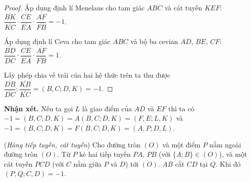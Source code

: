 \documentclass{article} %
\begin{document}
        \begin{proof}
            Áp dụng định lí Menelaus cho tam giác \(ABC\) và cát tuyến \(KEF\): \(\dfrac{\overline{BK}}{\overline{KC}} \cdot \dfrac{\overline{CE}}{\overline{EA}} \cdot \dfrac{\overline{AF}}{\overline{FB}} = -1\).

            Áp dụng định lí Ceva cho tam giác \(ABC\) và bộ ba cevian \(AD\), \(BE\), \(CF\): \(\dfrac{\overline{BD}}{\overline{DC}} \cdot \dfrac{\overline{CE}}{\overline{EA}} \cdot \dfrac{\overline{AF}}{\overline{FB}} = 1\).

            Lấy phép chia vế trái của hai hệ thức trên ta thu được \(\dfrac{\overline{DB}}{\overline{DC}} : \dfrac{\overline{KB}}{\overline{KC}} = (B,C;D,K) = -1\).
        \end{proof}

        \textbf{Nhận xét.} Nếu ta gọi \(L\) là giao điểm của \(AD\) và \(EF\) thì ta có \(-1 = (B,C;D,K) = A(B,C;D,K) = (F,E;L,K)\) và \(-1 = (B,C;D,K) = F(B,C;D,K) = (A,P;D,L)\).

        \begin{property}
            (\textit{Hàng tiếp tuyến, cát tuyến}) Cho đường tròn \((O)\) và một điểm \(P\) nằm ngoài đường tròn \((O)\). Từ \(P\) kẻ hai tiếp tuyến \(PA\), \(PB\) (với \(\{A;B\} \in (O)\)), và một cát tuyến \(PCD\) (với \(C\) nằm giữa \(P\) và \(D\)) tới \((O)\). \(AB\) cắt \(CD\) tại \(Q\). Khi đó \((P,Q;C,D) = -1\).
        \end{property}
\end{document}
